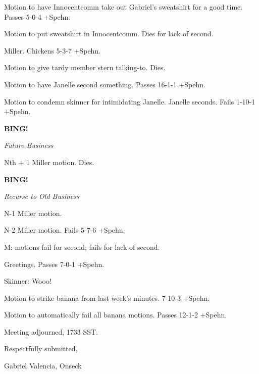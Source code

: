 \documentclass[12pt]{article}
\newcommand{\bing}{{\bf BING!} }
\newcommand{\goto}[1]{\bing \vskip 12pt \centerline{{\em{#1}}}}
\begin{document}
Motion to have Innocentcomm take out Gabriel's sweatshirt for a good time. Passes 5-0-4 +Spehn.

Motion to put sweatshirt in Innocentcomm. Dies for lack of second.

Miller. Chickens 5-3-7 +Spehn.

Motion to give tardy member stern talking-to. Dies.

Motion to have Janelle second something. Passes 16-1-1 +Spehn.

Motion to condemn skinner for intimidating Janelle. Janelle seconds. Fails 1-10-1 +Spehn.

\goto{Future Business}

Nth + 1 Miller motion. Dies.

\goto{Recurse to Old Business}

N-1 Miller motion.

N-2 Miller motion. Fails 5-7-6 +Spehn.

M: motions fail for second; fails for lack of second.

Greetings. Passes 7-0-1 +Spehn.

Skinner: Wooo!

Motion to strike banana from last week's minutes. 7-10-3 +Spehn.

Motion to automatically fail all banana motions. Passes 12-1-2 +Spehn.

\vspace{12pt}

\noindent
Meeting adjourned, 1733 SST.

\vspace{18pt}

\centerline{Respectfully submitted,}
\centerline{Gabriel Valencia, Onseck}
\end{document}
